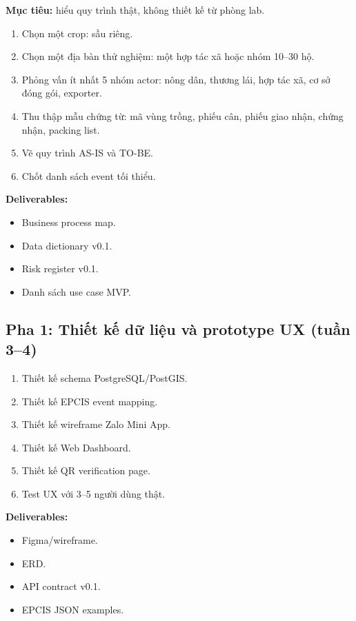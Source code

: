 \documentclass[12pt,a4paper]{article}
\begin{document}
\textbf{Mục tiêu:} hiểu quy trình thật, không thiết kế từ phòng lab.

\begin{enumerate}[leftmargin=2em]
    \item Chọn một crop: sầu riêng.
    \item Chọn một địa bàn thử nghiệm: một hợp tác xã hoặc nhóm 10--30 hộ.
    \item Phỏng vấn ít nhất 5 nhóm actor: nông dân, thương lái, hợp tác xã, cơ sở đóng gói, exporter.
    \item Thu thập mẫu chứng từ: mã vùng trồng, phiếu cân, phiếu giao nhận, chứng nhận, packing list.
    \item Vẽ quy trình AS-IS và TO-BE.
    \item Chốt danh sách event tối thiểu.
\end{enumerate}

\textbf{Deliverables:}
\begin{itemize}[leftmargin=2em]
    \item Business process map.
    \item Data dictionary v0.1.
    \item Risk register v0.1.
    \item Danh sách use case MVP.
\end{itemize}

\subsection{Pha 1: Thiết kế dữ liệu và prototype UX (tuần 3--4)}

\begin{enumerate}[leftmargin=2em]
    \item Thiết kế schema PostgreSQL/PostGIS.
    \item Thiết kế EPCIS event mapping.
    \item Thiết kế wireframe Zalo Mini App.
    \item Thiết kế Web Dashboard.
    \item Thiết kế QR verification page.
    \item Test UX với 3--5 người dùng thật.
\end{enumerate}

\textbf{Deliverables:}
\begin{itemize}[leftmargin=2em]
    \item Figma/wireframe.
    \item ERD.
    \item API contract v0.1.
    \item EPCIS JSON examples.
\end{itemize}
\end{document}
